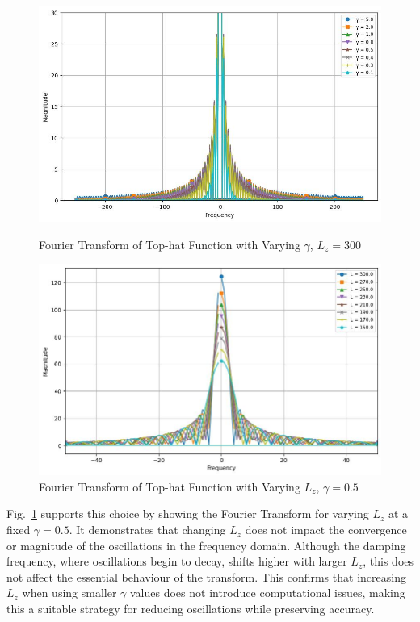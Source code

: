 \begin{figure}[htbp]
  \centering
  \begin{minipage}[b]{0.45\textwidth}
    \centering
    \includegraphics[width=\linewidth]{images/fourieroftophatvarygammaL300.jpg}
    \caption{Fourier Transform of Top-hat Function with Varying $\gamma$, $L_z = 300$}
    \label{fig:fourieroftophatvarygammaL300}
  \end{minipage}
  \hfill
  \begin{minipage}[b]{0.45\textwidth}
    \centering
    \includegraphics[width=\linewidth]{images/fourieroftophatvaryL_gamma0.5.jpg}
    \caption{Fourier Transform of Top-hat Function with Varying $L_z$, $\gamma = 0.5$}
    \label{fig:fourieroftophatvaryL_gamma0}
  \end{minipage}
\end{figure}

Fig.~\ref{fig:fourieroftophatvaryL_gamma0} supports this choice by showing the Fourier Transform for varying $L_z$ at a fixed $\gamma = 0.5$. It demonstrates that changing $L_z$ does not impact the convergence or magnitude of the oscillations in the frequency domain. Although the damping frequency, where oscillations begin to decay, shifts higher with larger $L_z$, this does not affect the essential behaviour of the transform. This confirms that increasing $L_z$ when using smaller $\gamma$ values does not introduce computational issues, making this a suitable strategy for reducing oscillations while preserving accuracy.

